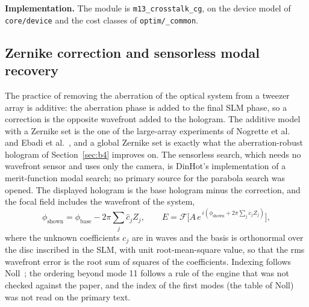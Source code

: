\textbf{Implementation.} The module is \texttt{m13\_crosstalk\_cg}, on the device model of \texttt{core/device} and the cost classes of \texttt{optim/\_common}.

\subsection{Zernike correction and sensorless modal recovery}\label{sec:m14}

The practice of removing the aberration of the optical system from a tweezer array is additive: the aberration phase is added to the final SLM phase, so a correction is the opposite wavefront added to the hologram. The additive model with a Zernike set is the one of the large-array experiments of Nogrette et al.~\cite{nogrette} and Ebadi et al.~\cite{ebadi2021}, and a global Zernike set is exactly what the aberration-robust hologram of Section~\ref{sec:b4} improves on. The sensorless search, which needs no wavefront sensor and uses only the camera, is DinHot's implementation of a merit-function modal search; no primary source for the parabola search was opened. The displayed hologram is the base hologram minus the correction, and the focal field includes the wavefront of the system,
\begin{equation}
\phi_{\mathrm{shown}}=\phi_{\mathrm{base}}-2\pi\sum_j\hat c_jZ_j,\qquad
E=\mathcal F\Big[A\,e^{\,i(\phi_{\mathrm{shown}}+2\pi\sum_jc_jZ_j)}\Big],
\label{eq:m14}
\end{equation}
where the unknown coefficients $c_j$ are in waves and the basis is orthonormal over the disc inscribed in the SLM, with unit root-mean-square value, so that the rms wavefront error is the root sum of squares of the coefficients. Indexing follows Noll~\cite{noll}; the ordering beyond mode 11 follows a rule of the engine that was not checked against the paper, and the index of the first modes (the table of Noll) was not read on the primary text.

